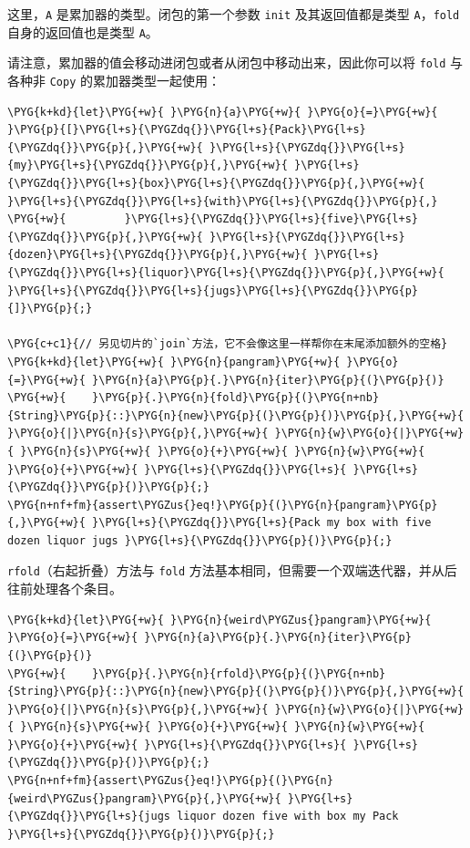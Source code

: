 这里，\texttt{A} 是累加器的类型。闭包的第一个参数 \texttt{init} 及其返回值都是类型 \texttt{A}，\texttt{fold} 自身的返回值也是类型 \texttt{A}。

请注意，累加器的值会移动进闭包或者从闭包中移动出来，因此你可以将 \texttt{fold} 与各种非 \texttt{Copy} 的累加器类型一起使用：

\begin{Verbatim}[commandchars=\\\{\},breaklines=true,breakanywhere=true,fontsize=\codefont,xleftmargin=17bp]
\PYG{k+kd}{let}\PYG{+w}{ }\PYG{n}{a}\PYG{+w}{ }\PYG{o}{=}\PYG{+w}{ }\PYG{p}{[}\PYG{l+s}{\PYGZdq{}}\PYG{l+s}{Pack}\PYG{l+s}{\PYGZdq{}}\PYG{p}{,}\PYG{+w}{ }\PYG{l+s}{\PYGZdq{}}\PYG{l+s}{my}\PYG{l+s}{\PYGZdq{}}\PYG{p}{,}\PYG{+w}{ }\PYG{l+s}{\PYGZdq{}}\PYG{l+s}{box}\PYG{l+s}{\PYGZdq{}}\PYG{p}{,}\PYG{+w}{ }\PYG{l+s}{\PYGZdq{}}\PYG{l+s}{with}\PYG{l+s}{\PYGZdq{}}\PYG{p}{,}
\PYG{+w}{         }\PYG{l+s}{\PYGZdq{}}\PYG{l+s}{five}\PYG{l+s}{\PYGZdq{}}\PYG{p}{,}\PYG{+w}{ }\PYG{l+s}{\PYGZdq{}}\PYG{l+s}{dozen}\PYG{l+s}{\PYGZdq{}}\PYG{p}{,}\PYG{+w}{ }\PYG{l+s}{\PYGZdq{}}\PYG{l+s}{liquor}\PYG{l+s}{\PYGZdq{}}\PYG{p}{,}\PYG{+w}{ }\PYG{l+s}{\PYGZdq{}}\PYG{l+s}{jugs}\PYG{l+s}{\PYGZdq{}}\PYG{p}{]}\PYG{p}{;}

\PYG{c+c1}{// 另见切片的`join`方法，它不会像这里一样帮你在末尾添加额外的空格}
\PYG{k+kd}{let}\PYG{+w}{ }\PYG{n}{pangram}\PYG{+w}{ }\PYG{o}{=}\PYG{+w}{ }\PYG{n}{a}\PYG{p}{.}\PYG{n}{iter}\PYG{p}{(}\PYG{p}{)}
\PYG{+w}{    }\PYG{p}{.}\PYG{n}{fold}\PYG{p}{(}\PYG{n+nb}{String}\PYG{p}{::}\PYG{n}{new}\PYG{p}{(}\PYG{p}{)}\PYG{p}{,}\PYG{+w}{ }\PYG{o}{|}\PYG{n}{s}\PYG{p}{,}\PYG{+w}{ }\PYG{n}{w}\PYG{o}{|}\PYG{+w}{ }\PYG{n}{s}\PYG{+w}{ }\PYG{o}{+}\PYG{+w}{ }\PYG{n}{w}\PYG{+w}{ }\PYG{o}{+}\PYG{+w}{ }\PYG{l+s}{\PYGZdq{}}\PYG{l+s}{ }\PYG{l+s}{\PYGZdq{}}\PYG{p}{)}\PYG{p}{;}
\PYG{n+nf+fm}{assert\PYGZus{}eq!}\PYG{p}{(}\PYG{n}{pangram}\PYG{p}{,}\PYG{+w}{ }\PYG{l+s}{\PYGZdq{}}\PYG{l+s}{Pack my box with five dozen liquor jugs }\PYG{l+s}{\PYGZdq{}}\PYG{p}{)}\PYG{p}{;}
\end{Verbatim}

\texttt{rfold}（右起折叠）方法与 \texttt{fold} 方法基本相同，但需要一个双端迭代器，并从后往前处理各个条目。

\begin{Verbatim}[commandchars=\\\{\},breaklines=true,breakanywhere=true,fontsize=\codefont,xleftmargin=17bp]
\PYG{k+kd}{let}\PYG{+w}{ }\PYG{n}{weird\PYGZus{}pangram}\PYG{+w}{ }\PYG{o}{=}\PYG{+w}{ }\PYG{n}{a}\PYG{p}{.}\PYG{n}{iter}\PYG{p}{(}\PYG{p}{)}
\PYG{+w}{    }\PYG{p}{.}\PYG{n}{rfold}\PYG{p}{(}\PYG{n+nb}{String}\PYG{p}{::}\PYG{n}{new}\PYG{p}{(}\PYG{p}{)}\PYG{p}{,}\PYG{+w}{ }\PYG{o}{|}\PYG{n}{s}\PYG{p}{,}\PYG{+w}{ }\PYG{n}{w}\PYG{o}{|}\PYG{+w}{ }\PYG{n}{s}\PYG{+w}{ }\PYG{o}{+}\PYG{+w}{ }\PYG{n}{w}\PYG{+w}{ }\PYG{o}{+}\PYG{+w}{ }\PYG{l+s}{\PYGZdq{}}\PYG{l+s}{ }\PYG{l+s}{\PYGZdq{}}\PYG{p}{)}\PYG{p}{;}
\PYG{n+nf+fm}{assert\PYGZus{}eq!}\PYG{p}{(}\PYG{n}{weird\PYGZus{}pangram}\PYG{p}{,}\PYG{+w}{ }\PYG{l+s}{\PYGZdq{}}\PYG{l+s}{jugs liquor dozen five with box my Pack }\PYG{l+s}{\PYGZdq{}}\PYG{p}{)}\PYG{p}{;}
\end{Verbatim}

